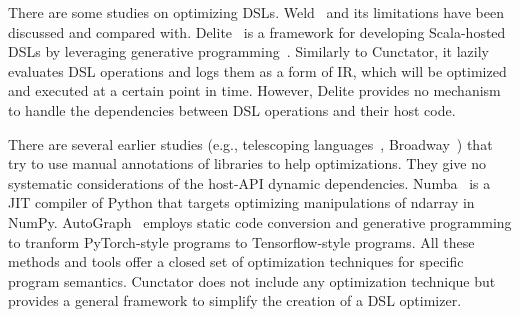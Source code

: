 \documentclass[sigconf]{acmart}\settopmatter{printfolios=true,printccs=false,printacmref=false}\setcopyright{none}
\begin{document}


There are some studies on optimizing DSLs. Weld~\cite{palkar2017weld} and its limitations have been discussed and compared with. 
Delite~\cite{Sujeeth:2014} is a framework for developing Scala-hosted DSLs by leveraging generative programming~\cite{Czarnecki:2000}. Similarly to Cunctator, it lazily evaluates DSL operations and logs them as a form of IR, which will be optimized and executed at a certain point in time. However, Delite provides no mechanism to handle the dependencies between DSL operations and their host code.

There are several earlier studies (e.g., telescoping languages~\cite{telescoping}, Broadway~\cite{Broadway}) that try to use manual annotations of libraries to help optimizations. They give no systematic considerations of the host-API dynamic dependencies. Numba~\cite{Lam:2015} is a JIT compiler of Python that targets optimizing manipulations of ndarray in NumPy. AutoGraph~\cite{AutoGraph} employs static code conversion and generative programming to tranform PyTorch-style programs to Tensorflow-style programs. All these methods and tools offer a closed set of optimization techniques for specific program semantics. Cunctator does not include any optimization technique but provides a general framework to simplify the creation of a DSL optimizer.





\end{document}
